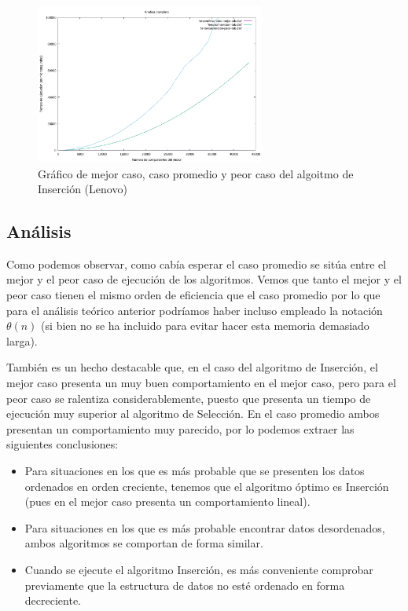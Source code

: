 \documentclass{homework}
\begin{document}
    \begin{figure}[H]
        \centering
        \label{lenovo:insercion-mp}
           \includegraphics[width=0.67\textwidth]{../data/lenovo-insercion-mp.pdf}
        \caption{Gráfico de mejor caso, caso promedio y peor caso del algoitmo de Inserción (Lenovo)}
    \end{figure}

    \subsection{Análisis}

    Como podemos observar, como cabía esperar el caso promedio se sitúa entre el mejor y el peor caso de ejecución
    de los algoritmos. Vemos que tanto el mejor y el peor caso tienen el mismo orden de eficiencia que el caso promedio
    por lo que para el análisis teórico anterior podríamos haber incluso empleado la notación $\theta (n)$ (si bien no
    se ha incluido para evitar hacer esta memoria demasiado larga). 
    
    También es un hecho destacable que, en el caso del algoritmo de Inserción, el mejor caso presenta un muy buen
    comportamiento en el mejor caso, pero para el peor caso se ralentiza considerablemente, puesto que presenta
    un tiempo de ejecución muy superior al algoritmo de Selección. En el caso promedio ambos presentan un comportamiento
    muy parecido, por lo podemos extraer las siguientes conclusiones:
    
    \begin{itemize}
        \item Para situaciones en los que es más probable que se presenten los datos ordenados en orden creciente, tenemos que el algoritmo óptimo es Inserción (pues en el mejor caso presenta un comportamiento lineal). 
        \item Para situaciones en los que es más probable encontrar datos desordenados, ambos algoritmos se comportan de forma similar. 
        \item Cuando se ejecute el algoritmo Inserción, es más conveniente comprobar previamente que la estructura de datos no esté ordenado en forma decreciente.
    \end{itemize}
    
\end{document}
